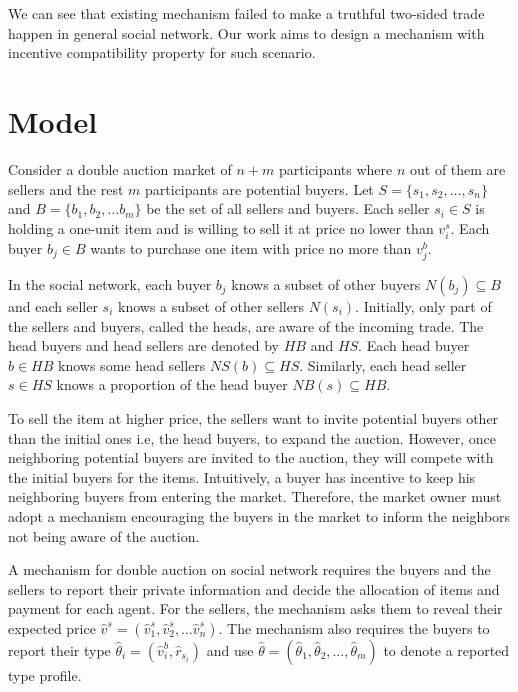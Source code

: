 \documentclass[format=acmsmall, review=false, natbib=false]{acmart}
\begin{document}
We can see that existing mechanism failed to make a truthful two-sided trade happen in general social network. Our work aims to design a mechanism with incentive compatibility property for such scenario.

\section{Model}

Consider a double auction market of $n+m$ participants
where $n$ out of them are sellers and the rest $m$ participants are potential buyers. Let $S=\{s_1,s_2,\ldots, s_n\}$ and $B=\{b_1,b_2,\ldots b_m\}$ be the set of all sellers and buyers.
Each seller $s_i\in S$ is holding a one-unit item and is willing to sell it at price no lower than $v^s_i$. Each buyer $b_j\in B$ wants to purchase one item with price no more than $v^b_j$.

In the social network, each buyer $b_j$ knows a subset of other buyers $N(b_j)\subseteq B$ and each seller $s_i$ knows a subset of other sellers $N(s_i)$.
Initially, only part of the sellers and buyers, called the heads, are aware of the incoming trade.
The head buyers and head sellers are denoted by $HB$ and $HS$.
Each head buyer $b\in HB$ knows some head sellers $NS(b) \subseteq HS$.
Similarly, each head seller $s\in HS$ knows a proportion of the head buyer $NB(s) \subseteq HB$.

To sell the item at higher price, the sellers want to invite potential buyers other than the initial ones i.e, the head buyers, to expand the auction.
However, once neighboring potential buyers are invited to the auction, they will compete with the initial buyers for the items. Intuitively, a buyer has incentive to keep his neighboring buyers from entering the market.
Therefore, the market owner must adopt a mechanism encouraging the buyers in the market to inform the neighbors not being aware of the auction.

A mechanism for double auction on social network requires the buyers and the sellers to report their private information and decide the allocation of items and payment for each agent.
For the sellers, the mechanism asks them to reveal their expected price $\hat v^s=(\hat v^s_1,\hat v^s_2,\ldots \hat v^s_n)$.
The mechanism also requires the buyers to report their type $\hat\theta_i = (\hat v^b_i, \hat r_{s_i})$ and use $\hat\theta = (\hat\theta_1,\hat\theta_2,\ldots,\hat\theta_m)$ to denote a reported type profile.
\end{document}
